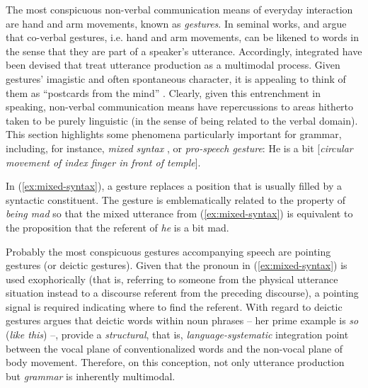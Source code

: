 \documentclass[output=paper]{langsci/langscibook}
\begin{document}
The most conspicuous non-verbal communication means of everyday interaction are hand and arm movements, known as \emph{gestures}.
%
In seminal works, \citet{McNeill:1985,McNeill:1992} and \citet{Kendon:1980,Kendon:2004} argue that co-verbal gestures, i.e. hand and arm movements, can be likened to words in the sense that they are part of a speaker's utterance.
%
Accordingly, integrated  have been devised \citep{Kita:Ozyurek:2003,de:Ruiter:2000,Krauss:Chen:Gottesmann:2000} that treat utterance production as a multimodal process.
%
Given gestures' imagistic  and often spontaneous character, it is appealing to think of them as \enquote{postcards from the mind} \citep[p.~21]{de:Ruiter:2007:a}.
%
Clearly, given this entrenchment in speaking, non-verbal communication means have repercussions to areas hitherto taken to be purely linguistic (in the sense of being related to the verbal domain).
%
This section highlights some phenomena particularly important for grammar, including, for instance,  \emph{mixed syntax}  \citep{Slama-Cazacu:1976}, or \emph{pro-speech gesture}: 
%
\ea \label{ex:mixed-syntax}
He is a bit [\textit{circular movement of index finger in front of temple}].
\z

In (\ref{ex:mixed-syntax}), a gesture replaces a position that is usually filled by a syntactic constituent.
%
The gesture is emblematically related to the property of \textit{being mad} so that the mixed utterance from (\ref{ex:mixed-syntax}) is equivalent to the proposition that the referent of \textit{he} is a bit mad.

Probably the most conspicuous gestures accompanying speech are pointing gestures (or deictic gestures).
%
Given that the pronoun in (\ref{ex:mixed-syntax}) is used exophorically (that is, referring to someone from the physical utterance situation instead to a discourse referent from the preceding discourse), a pointing signal is required indicating where to find the referent. 
%
With regard to deictic gestures \citet[Sec.~5.4]{Fricke:2012} argues that deictic words   within noun phrases -- her prime example is  \textit{so} (\textit{like this}) --, provide a \emph{structural}, that is, \emph{language-systematic} integration point between the vocal plane of conventionalized words and the non-vocal plane of body movement. 
%
Therefore, on this conception, not only utterance production but \emph{grammar} is inherently multimodal. 
\end{document}
